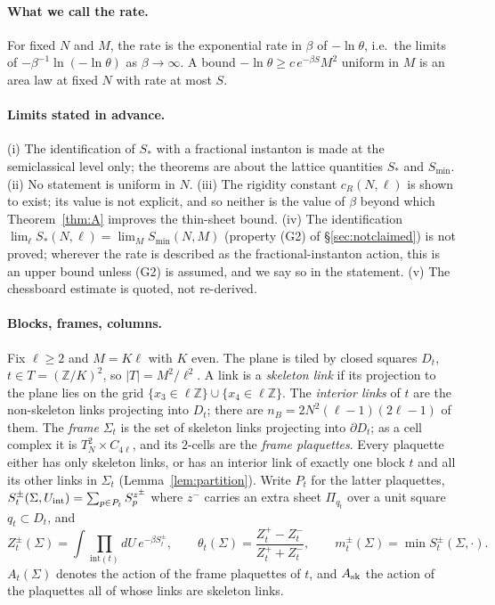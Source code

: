 \documentclass[11pt,a4paper]{article}
\theoremstyle{definition}
\theoremstyle{remark}
\begin{document}
\paragraph{What we call the rate.}
For fixed $N$ and $M$, the rate is the exponential rate in $\beta$ of $-\ln\theta$, i.e.\ the limits of $-\beta^{-1}\ln(-\ln\theta)$ as $\beta\to\infty$.
A bound $-\ln\theta\ge c\,e^{-\beta S}M^2$ uniform in $M$ is an area law at fixed $N$ with rate at most $S$.

\paragraph{Limits stated in advance.}
(i) The identification of $S_*$ with a fractional instanton is made at the semiclassical level only; the theorems are about the lattice quantities $S_*$ and $S_{\min}$.
(ii) No statement is uniform in $N$.
(iii) The rigidity constant $c_R(N,\ell)$ is shown to exist; its value is not explicit, and so neither is the value of $\beta$ beyond which Theorem~\ref{thm:A} improves the thin-sheet bound.
(iv) The identification $\lim_\ell S_*(N,\ell)=\lim_MS_{\min}(N,M)$ (property (G2) of \S\ref{sec:notclaimed}) is not proved; wherever the rate is described as the fractional-instanton action, this is an upper bound unless (G2) is assumed, and we say so in the statement.
(v) The chessboard estimate is quoted, not re-derived.

\paragraph{Blocks, frames, columns.}
Fix $\ell\ge2$ and $M=K\ell$ with $K$ even.
The plane is tiled by closed squares $D_t$, $t\in T=(\mathbb{Z}/K)^2$, so $|T|=M^2/\ell^2$.
A link is a \emph{skeleton link} if its projection to the plane lies on the grid $\{x_3\in\ell\mathbb{Z}\}\cup\{x_4\in\ell\mathbb{Z}\}$.
The \emph{interior links} of $t$ are the non-skeleton links projecting into $D_t$; there are $n_B=2N^2(\ell-1)(2\ell-1)$ of them.
The \emph{frame} $\Sigma_t$ is the set of skeleton links projecting into $\partial D_t$; as a cell complex it is $T^2_N\times C_{4\ell}$, and its $2$-cells are the \emph{frame plaquettes}.
Every plaquette either has only skeleton links, or has an interior link of exactly one block $t$ and all its other links in $\Sigma_t$ (Lemma~\ref{lem:partition}).
Write $P_t$ for the latter plaquettes, $S^\pm_t(\Sigma,U_{\rm int})=\sum_{p\in P_t}S^{z^\pm}_p$ where $z^-$ carries an extra sheet $\Pi_{q_t}$ over a unit square $q_t\subset D_t$, and
\[ Z^\pm_t(\Sigma)=\int\prod_{\mathrm{int}(t)}dU\,e^{-\beta S^\pm_t},\qquad \theta_t(\Sigma)=\frac{Z^+_t-Z^-_t}{Z^+_t+Z^-_t},\qquad m^\pm_t(\Sigma)=\min S^\pm_t(\Sigma,\cdot). \]
$A_t(\Sigma)$ denotes the action of the frame plaquettes of $t$, and $A_{\rm sk}$ the action of the plaquettes all of whose links are skeleton links.
\end{document}
